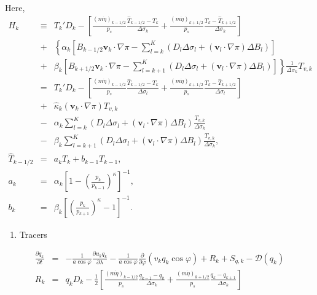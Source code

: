 Here,
\begin{eqnarray}
   H_k
     &\equiv &  T_k' D_k
              - \left[   \frac{(m\dot{\eta})_{k-1/2}}{p_s} \frac{\hat{T}_{k-1/2} - T_k}{\Delta\sigma_k}
               + \frac{(m\dot{\eta})_{k+1/2}}{p_s} \frac{T_k - \hat{T}_{k+1/2}}{\Delta\sigma_k} \right] \\
        &+& \left\{ \alpha_k
                    \left[ B_{k-1/2} {\mathbf{v}}_k \cdot \nabla \pi
                          - \sum_{l=k}^{K}
                           (D_l \Delta \sigma_l + ({\mathbf{v}}_l \cdot \nabla \pi)\Delta B_l)
                    \right]
             \right. \\
          &+& \left. \beta_k
                     \left[ B_{k+1/2} {\mathbf{v}}_k \cdot \nabla \pi
                          - \sum_{l=k+1}^{K}
                           (D_l \Delta \sigma_l + ({\mathbf{v}}_l \cdot \nabla \pi)\Delta B_l)
                    \right]
              \right\}
              \frac{1}{\Delta \sigma_k} T_{v,k} \\
     &= & T_k' D_k
          - \left[ \frac{(m\dot{\eta})_{k-1/2}}{p_s} \frac{\hat{T}_{k-1/2} - T_k}{\Delta \sigma_l}
               + \frac{(m\dot{\eta})_{k+1/2}}{p_s} \frac{T_k - \hat{T}_{k+1/2}}{\Delta \sigma_l} \right] \\
        &+& \hat{\kappa}_k ({\mathbf{v}}_k \cdot \nabla \pi) T_{v,k} \\
        &-& \alpha_k \sum_{l=k}^{K}
                           (D_l \Delta \sigma_l + ({\mathbf{v}}_l \cdot \nabla \pi)\Delta B_l)
                            \frac{T_{v,k}}{\Delta \sigma_k} \\
        &-& \beta_k \sum_{l=k+1}^{K}
                           (D_l \Delta \sigma_l + ({\mathbf{v}}_l \cdot \nabla \pi)\Delta B_l)
                            \frac{T_{v,k}}{\Delta \sigma_k}, \\
  \hat{T}_{k-1/2}
   &=& a_k T_k + b_{k-1} T_{k-1}, \\
  a_k  &=&  \alpha_k
              \left[ 1- \left( \frac{ p_k }{ p_{k-1} }
                        \right)^{\kappa} \right]^{-1},  \\
  b_k  &=&  \beta_k
              \left[ \left( \frac{ p_k }{ p_{k+1} }
                     \right)^{\kappa} - 1 \right]^{-1} .
\end{eqnarray}

\begin{enumerate}
\def\labelenumi{\arabic{enumi}.}
\setcounter{enumi}{4}
\tightlist
\item
  Tracers
\end{enumerate}
\begin{eqnarray}
  \frac{\partial q_k}{\partial t}
      &=&   - \frac{1}{a\cos\varphi}
               \frac{\partial u_k q_k}{\partial \lambda}
          - \frac{1}{a\cos\varphi}
               \frac{\partial }{\partial \varphi} ( v_k q_k\cos\varphi)
          + R_k
          + S_{q,k}
          - {\mathcal D}(q_k) \\
R_k  &=&  q_k D_k
       - \frac{1}{2}
             \left[   \frac{(m\dot{\eta})_{k-1/2}}{p_s} \frac{q_{k-1} - q_k}{\Delta\sigma_k}
               + \frac{(m\dot{\eta})_{k+1/2}}{p_s} \frac{q_k   - q_{k+1}}{\Delta\sigma_k} \right]
\end{eqnarray}

